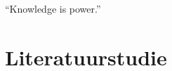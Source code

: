 \begin{savequote}[0.55\linewidth]
	``Knowledge is power.''
\end{savequote}

\chapter{Literatuurstudie}
\label{chap:literatuurstudie}

\newpage

\newpage

\newpage

\newpage

\newpage

\newpage

\newpage